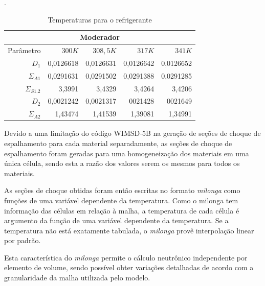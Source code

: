 \begin{table}[htb]
  \centering
  \caption[Temperaturas para o refrigerante.]{Temperaturas para o refrigerante}.
  \label{tab:temp-coolant}
  \begin{tabular}{r r r r r}
    \multicolumn{5}{c}{Moderador} \\
    \hline
    Parâmetro & $300K$ & $308,5K$ & $317K$ & $341K$ \\
    \hline
    $D_1$ & 0,0126618 & 0,0126631 & 0,0126642 & 0,0126652\\
    $\Sigma_{A1}$ & 0,0291631 & 0,0291502 & 0,0291388 & 0,0291285\\
    $\Sigma_{S1.2}$ & 3,3991 & 3,4329 & 3,4264 & 3,4206\\
    \hline
    $D_2$ & 0,0021242 & 0,0021317 & 0021428 & 0021649\\
    $\Sigma_{A2}$ & 1,43474 & 1,41539 & 1,39081 & 1,34991\\
    \hline
  \end{tabular}
\end{table}

Devido a uma limitação do código WIMSD-5B na geração de seções de choque de espalhamento
para cada material separadamente, as seções de choque de
espalhamento foram geradas para uma homogeneização dos materiais em uma única célula,
sendo esta a razão dos valores serem os mesmos para todos os materiais.

%
%
As seções de choque obtidas foram então escritas no formato \textit{milonga} como
funções de uma variável dependente da temperatura. Como o milonga tem informação
das células em relação à malha, a temperatura de cada célula é argumento da
função de uma variável dependente da temperatura. Se a temperatura não está
exatamente tabulada, o \textit{milonga} provê interpolação linear por padrão.

Esta característica do \textit{milonga} permite o cálculo neutrônico
independente por elemento de volume, sendo possível obter variações detalhadas
de acordo com a granularidade da malha utilizada pelo modelo.
